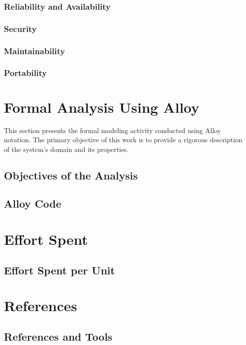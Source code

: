 \documentclass{article}
\begin{document}
\subsubsection{Reliability and Availability}
\subsubsection{Security}
\subsubsection{Maintainability}
\subsubsection{Portability}

\section{Formal Analysis Using Alloy}
This section presents the formal modeling activity conducted using Alloy notation. The primary objective of this work is to provide a rigorous description of the system's domain and its properties.
\subsection{Objectives of the Analysis}
\subsection{Alloy Code}
\section{Effort Spent}
\subsection{Effort Spent per Unit}

\section{References}
\subsection{References and Tools}

\maketitle
\end{document}
